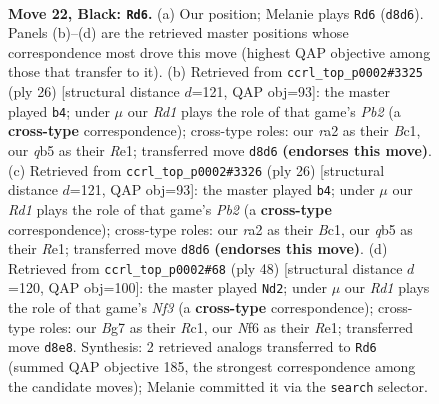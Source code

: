 \documentclass[11pt]{article}
\begin{document}
\begin{figure}[p]\centering
\begin{subfigure}{0.46\textwidth}\centering
\resizebox{\linewidth}{!}{%
\newchessgame
\chessboard[
  setfen={rnbr2k1/pp2qpb1/4pnp1/1Q1p3p/P2P3P/1B2BNP1/RPP2P2/1N2R1K1 b - - 8 22},
  showmover=false,
  pgfstyle=straightmove, color=movearrow, markmove={d8-d6}
]}
\caption{}
\end{subfigure}\hfill
\begin{subfigure}{0.46\textwidth}\centering
\resizebox{\linewidth}{!}{%
\newchessgame
\chessboard[
  setfen={r1b2rk1/ppp1b1pp/3p1n2/3P1p1q/2P1pP2/2N3P1/PPQ2PBP/R1B1R1K1 w - - 0 14},
  showmover=false,
  pgfstyle=straightmove, color=movearrow, markmove={b2-b4}
]}
\caption{}
\end{subfigure}
\\[4pt]
\begin{subfigure}{0.46\textwidth}\centering
\resizebox{\linewidth}{!}{%
\newchessgame
\chessboard[
  setfen={r1b2rk1/ppp1b1pp/3p1n2/3P1p1q/2P1pP2/2N3P1/PPQ2PBP/R1B1R1K1 w - - 0 14},
  showmover=false,
  pgfstyle=straightmove, color=movearrow, markmove={b2-b4}
]}
\caption{}
\end{subfigure}\hfill
\begin{subfigure}{0.46\textwidth}\centering
\resizebox{\linewidth}{!}{%
\newchessgame
\chessboard[
  setfen={r3r1k1/1bp1npp1/p2bq2p/1p1p4/1P1P4/PQB1PNP1/5PBP/2R1R1K1 w - - 0 25},
  showmover=false,
  pgfstyle=straightmove, color=movearrow, markmove={f3-d2}
]}
\caption{}
\end{subfigure}
\caption{\textbf{Move 22, Black: \texttt{Rd6}.} (a) Our position; Melanie plays \texttt{Rd6} (\texttt{d8d6}). Panels (b)--(d) are the retrieved master positions whose correspondence most drove this move (highest QAP objective among those that transfer to it). (b) Retrieved from \texttt{ccrl\_top\_p0002\#3325} (ply 26) [structural distance $d$=121, QAP obj=93]: the master played \texttt{b4}; under $\mu$ our \emph{Rd1} plays the role of that game's \emph{Pb2} (a \textbf{cross-type} correspondence); cross-type roles: our \emph{r}a2 as their \emph{B}c1, our \emph{q}b5 as their \emph{R}e1; transferred move \texttt{d8d6} \textbf{(endorses this move)}. (c) Retrieved from \texttt{ccrl\_top\_p0002\#3326} (ply 26) [structural distance $d$=121, QAP obj=93]: the master played \texttt{b4}; under $\mu$ our \emph{Rd1} plays the role of that game's \emph{Pb2} (a \textbf{cross-type} correspondence); cross-type roles: our \emph{r}a2 as their \emph{B}c1, our \emph{q}b5 as their \emph{R}e1; transferred move \texttt{d8d6} \textbf{(endorses this move)}. (d) Retrieved from \texttt{ccrl\_top\_p0002\#68} (ply 48) [structural distance $d$=120, QAP obj=100]: the master played \texttt{Nd2}; under $\mu$ our \emph{Rd1} plays the role of that game's \emph{Nf3} (a \textbf{cross-type} correspondence); cross-type roles: our \emph{B}g7 as their \emph{R}c1, our \emph{N}f6 as their \emph{R}e1; transferred move \texttt{d8e8}. Synthesis: 2 retrieved analogs transferred to \texttt{Rd6} (summed QAP objective 185, the strongest correspondence among the candidate moves); Melanie committed it via the \texttt{search} selector.}
\label{fig:thought-m43}
\end{figure}
\end{document}
